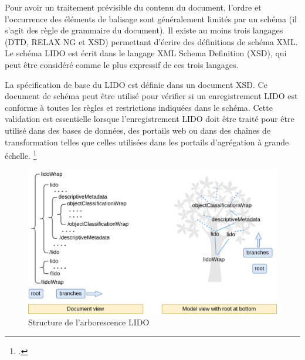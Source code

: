 Pour avoir un traitement prévisible du contenu du document, l'ordre et l'occurrence des éléments de balisage sont généralement limités par un schéma (il s'agit des règle de grammaire du document). Il existe au moins trois langages (DTD, RELAX NG et XSD) permettant d'écrire des définitions de schéma XML. Le schéma LIDO est écrit dans le langage XML Schema Definition (XSD), qui peut être considéré comme le plus expressif de ces trois langages. \newline

La spécification de base du LIDO est définie dans un document XSD. Ce document de schéma peut être utilisé pour vérifier si un enregistrement LIDO est conforme à toutes les règles et restrictions indiquées dans le schéma. Cette validation est essentielle lorsque l'enregistrement LIDO doit être traité pour être utilisé dans des bases de données, des portails web ou dans des chaînes de transformation telles que celles utilisées dans les portails d'agrégation à grande échelle. \footcite{lido_primer}

\begin{figure}[h!]
	\centerline{\includegraphics[width=\textwidth]{medias/figure_root-branches.png}}
	\caption{Structure de l'arborescence LIDO} 
\end{figure}